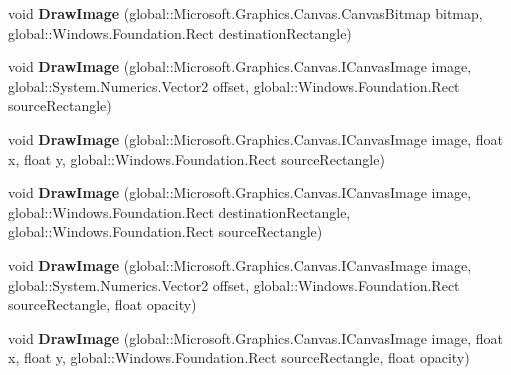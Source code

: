 \begin{DoxyCompactItemize}
void {\bfseries Draw\+Image} (global\+::\+Microsoft.\+Graphics.\+Canvas.\+Canvas\+Bitmap bitmap, global\+::\+Windows.\+Foundation.\+Rect destination\+Rectangle)
\item 
\mbox{\label{interface_microsoft_1_1_graphics_1_1_canvas_1_1_i_canvas_drawing_session_a9daab3a40c2194f97c638edb082a9c04}} 
void {\bfseries Draw\+Image} (global\+::\+Microsoft.\+Graphics.\+Canvas.\+I\+Canvas\+Image image, global\+::\+System.\+Numerics.\+Vector2 offset, global\+::\+Windows.\+Foundation.\+Rect source\+Rectangle)
\item 
\mbox{\label{interface_microsoft_1_1_graphics_1_1_canvas_1_1_i_canvas_drawing_session_a397cb8eca23ad1da1455e9c0f2c950e7}} 
void {\bfseries Draw\+Image} (global\+::\+Microsoft.\+Graphics.\+Canvas.\+I\+Canvas\+Image image, float x, float y, global\+::\+Windows.\+Foundation.\+Rect source\+Rectangle)
\item 
\mbox{\label{interface_microsoft_1_1_graphics_1_1_canvas_1_1_i_canvas_drawing_session_a7eadc4d8ba4b2ff60ad5e82583afa018}} 
void {\bfseries Draw\+Image} (global\+::\+Microsoft.\+Graphics.\+Canvas.\+I\+Canvas\+Image image, global\+::\+Windows.\+Foundation.\+Rect destination\+Rectangle, global\+::\+Windows.\+Foundation.\+Rect source\+Rectangle)
\item 
\mbox{\label{interface_microsoft_1_1_graphics_1_1_canvas_1_1_i_canvas_drawing_session_ac7b5a66f8426e0e819dd7e8e14011132}} 
void {\bfseries Draw\+Image} (global\+::\+Microsoft.\+Graphics.\+Canvas.\+I\+Canvas\+Image image, global\+::\+System.\+Numerics.\+Vector2 offset, global\+::\+Windows.\+Foundation.\+Rect source\+Rectangle, float opacity)
\item 
\mbox{\label{interface_microsoft_1_1_graphics_1_1_canvas_1_1_i_canvas_drawing_session_a21d76b9febfc14d4e7de5fc50a90605d}} 
void {\bfseries Draw\+Image} (global\+::\+Microsoft.\+Graphics.\+Canvas.\+I\+Canvas\+Image image, float x, float y, global\+::\+Windows.\+Foundation.\+Rect source\+Rectangle, float opacity)

\end{DoxyCompactItemize}
